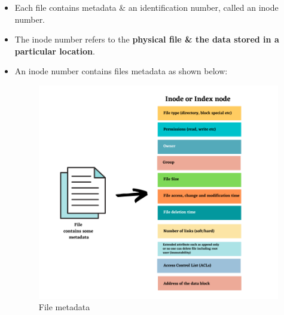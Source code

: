 \setlength{\columnsep}{3pt}
\begin{flushleft}
	\bigskip
	\begin{itemize}
		\item Each file contains metadata \& an identification number, called an inode number.
		\item The inode number refers to the \textbf{physical file \& the data stored in a particular location}.
		\item An inode number contains files metadata as shown below:
			\begin{figure}[h!]
				\centering
				\includegraphics[scale=.6]{content/chapter10/images/metadata.png}
				\caption{File metadata}
				\label{fig:File_attributes}
			\end{figure}
		
	\end{itemize}
	
\end{flushleft}

\newpage


